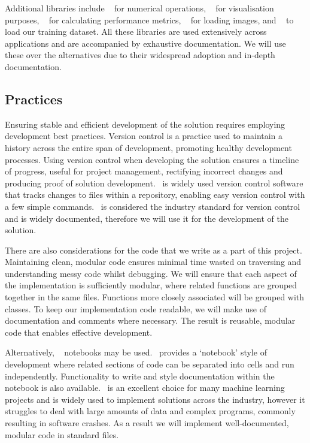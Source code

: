 Additional  libraries include ~\cite{numpy} for numerical operations, ~\cite{matplotlib} for visualisation purposes, ~\cite{scikitimage} for calculating performance metrics, ~\cite{openCV} for loading images, and ~\cite{tensorflowDatasets} to load our training dataset. All these libraries are used extensively across  applications and are accompanied by exhaustive documentation. We will use these over the alternatives due to their widespread adoption and in-depth documentation.

\subsection{Practices}
Ensuring stable and efficient development of the solution requires employing development best practices. Version control is a practice used to maintain a history across the entire span of development, promoting healthy development processes. Using version control when developing the solution ensures a timeline of progress, useful for project management, rectifying incorrect changes and producing proof of solution development.\  is widely used version control software that tracks changes to files within a repository, enabling easy version control with a few simple commands.\  is considered the industry standard for version control and is widely documented, therefore we will use it for the development of the solution.

There are also considerations for the code that we write as a part of this project. Maintaining clean, modular code ensures minimal time wasted on traversing and understanding messy code whilst debugging. We will ensure that each aspect of the implementation is sufficiently modular, where related functions are grouped together in the same  files. Functions more closely associated will be grouped with  classes. To keep our implementation code readable, we will make use of documentation and comments where necessary. The result is reusable, modular code that enables effective development.

Alternatively, ~\cite{jupyter} notebooks may be used.\  provides a `notebook' style of development where related sections of code can be separated into cells and run independently. Functionality to write and style documentation within the notebook is also available.\  is an excellent choice for many machine learning projects and is widely used to implement solutions across the industry, however it struggles to deal with large amounts of data and complex programs, commonly resulting in software crashes. As a result we will implement well-documented, modular code in standard  files.

